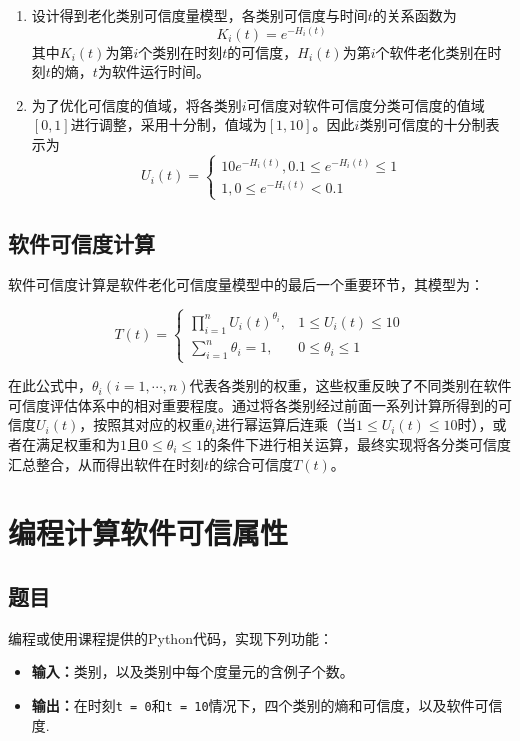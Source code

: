 \documentclass{article}
\begin{document}
\begin{enumerate}
	\item 设计得到老化类别可信度量模型，各类别可信度与时间\(t\)的关系函数为$$ K_{i}(t)=e^{-H_{i}(t)} $$其中\(K_{i}(t)\)为第\(i\)个类别在时刻\(t\)的可信度，\(H_{i}(t)\)为第\(i\)个软件老化类别在时刻\(t\)的熵，\(t\)为软件运行时间。
	
	\item 
	为了优化可信度的值域，将各类别\(i\)可信度对软件可信度分类可信度的值域\([0,1]\)进行调整，采用十分制，值域为\([1,10]\)。因此\(i\)类别可信度的十分制表示为$$ U_{i}(t)=\left\{\begin{array}{c}10e^{-H_{i}(t)}, 0.1\leq e^{-H_{i}(t)}\leq 1 \\ 1, 0\leq e^{-H_{i}(t)}<0.1\end{array}\right.$$
\end{enumerate}

\subsection{软件可信度计算}

软件可信度计算是软件老化可信度量模型中的最后一个重要环节，其模型为：

\[
T(t)=\begin{cases}
	\prod_{i = 1}^{n}U_{i}(t)^{\theta_{i}},&1\leq U_{i}(t)\leq10\\
	\sum_{i = 1}^{n}\theta_{i}=1,&0\leq\theta_{i}\leq1
\end{cases}
\]

在此公式中，\(\theta_{i}(i = 1,\cdots,n)\)代表各类别的权重，这些权重反映了不同类别在软件可信度评估体系中的相对重要程度。通过将各类别经过前面一系列计算所得到的可信度\(U_{i}(t)\)，按照其对应的权重\(\theta_{i}\)进行幂运算后连乘（当\(1\leq U_{i}(t)\leq10\)时），或者在满足权重和为\(1\)且\(0\leq\theta_{i}\leq1\)的条件下进行相关运算，最终实现将各分类可信度汇总整合，从而得出软件在时刻\(t\)的综合可信度\(T(t)\)。 

\section{编程计算软件可信属性}

\subsection{题目}

编程或使用课程提供的Python代码，实现下列功能：

\begin{itemize}
	\item \textbf{输入：}类别，以及类别中每个度量元的含例子个数。
	\item \textbf{输出：}在时刻\texttt{t = 0}和\texttt{t = 10}情况下，四个类别的熵和可信度，以及软件可信度.
\end{itemize}
\end{document}
